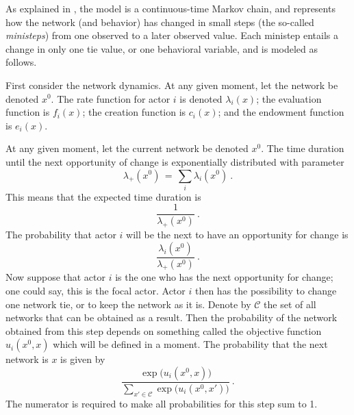 \documentclass[a4paper,fleqn,11pt]{article}
\newcommand{\+}{\, + \,}
\begin{document}
As explained in \citet*{SnijdersEA10b}, the model is a continuous-time
Markov chain, and represents how the network (and behavior) has changed
in small steps (the so-called \emph{ministeps}) from one observed
to a later observed value. Each ministep entails a change in only
one tie value, or one behavioral variable, and is modeled as follows.

First consider the network dynamics.
At any given moment, let the network be denoted $x^0$.
The rate function for actor $i$ is denoted $\lambda_i(x)$;
the evaluation function is $f_i(x)$; the creation function is $c_i(x)$;
and the endowment function is $e_i(x)$.

At any given moment, let the current network be denoted $x^0$.
The time duration until the next opportunity of change
is exponentially distributed with parameter
\[
  \lambda_+(x^0) \,=\, \sum_i \lambda_i(x^0) \ .
\]
This means that the expected time duration is
\[
   \frac{1}{\lambda_+(x^0)} \ .
\]
The probability that actor $i$ will be the next to
have an opportunity for change is
\[
  \frac{\lambda_i(x^0)}{\lambda_+(x^0)} \ .
\]
Now suppose that actor $i$ is the one who has the next opportunity
for change; one could say, this is the focal actor.
Actor $i$ then has the possibility to change one network tie,
or to keep the network as it is.
Denote by $\mathcal C$ the set of all networks that can be obtained
as a result.
Then the probability of the network obtained from this step depends on
something called the objective function $u_i(x^0, x)$ which will be defined
in a moment.
The probability that the next network is $x$ is given by
\begin{equation}
     \frac{\exp(u_i(x^0, x)\big)}
          {\sum_{x' \in \mathcal C} \exp\big(u_i(x^0, x')\big)} \ . \label{probab}
\end{equation}
The numerator is required to make all probabilities for this step sum to 1.
\end{document}
